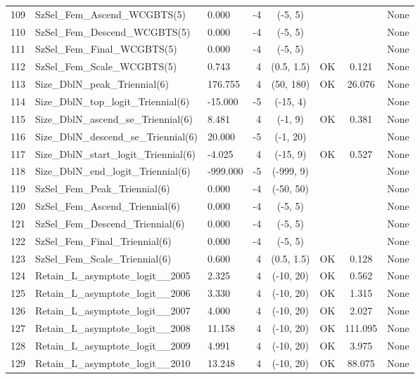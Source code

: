 \documentclass[12pt,]{article}
\begin{document}
\begin{landscape}
\begin{longtable}{lp{2.5in}lrcccl}
  109 & SzSel\_Fem\_Ascend\_WCGBTS(5) & 0.000 & -4 & (-5, 5) &  &  & None \\ 
  110 & SzSel\_Fem\_Descend\_WCGBTS(5) & 0.000 & -4 & (-5, 5) &  &  & None \\ 
  111 & SzSel\_Fem\_Final\_WCGBTS(5) & 0.000 & -4 & (-5, 5) &  &  & None \\ 
  112 & SzSel\_Fem\_Scale\_WCGBTS(5) & 0.743 & 4 & (0.5, 1.5) & OK & 0.121 & None \\ 
  113 & Size\_DblN\_peak\_Triennial(6) & 176.755 & 4 & (50, 180) & OK & 26.076 & None \\ 
  114 & Size\_DblN\_top\_logit\_Triennial(6) & -15.000 & -5 & (-15, 4) &  &  & None \\ 
  115 & Size\_DblN\_ascend\_se\_Triennial(6) & 8.481 & 4 & (-1, 9) & OK & 0.381 & None \\ 
  116 & Size\_DblN\_descend\_se\_Triennial(6) & 20.000 & -5 & (-1, 20) &  &  & None \\ 
  117 & Size\_DblN\_start\_logit\_Triennial(6) & -4.025 & 4 & (-15, 9) & OK & 0.527 & None \\ 
  118 & Size\_DblN\_end\_logit\_Triennial(6) & -999.000 & -5 & (-999, 9) &  &  & None \\ 
  119 & SzSel\_Fem\_Peak\_Triennial(6) & 0.000 & -4 & (-50, 50) &  &  & None \\ 
  120 & SzSel\_Fem\_Ascend\_Triennial(6) & 0.000 & -4 & (-5, 5) &  &  & None \\ 
  121 & SzSel\_Fem\_Descend\_Triennial(6) & 0.000 & -4 & (-5, 5) &  &  & None \\ 
  122 & SzSel\_Fem\_Final\_Triennial(6) & 0.000 & -4 & (-5, 5) &  &  & None \\ 
  123 & SzSel\_Fem\_Scale\_Triennial(6) & 0.600 & 4 & (0.5, 1.5) & OK & 0.128 & None \\ 
  124 & Retain\_L\_asymptote\_logit\_\_2005 & 2.325 & 4 & (-10, 20) & OK & 0.562 & None \\ 
  125 & Retain\_L\_asymptote\_logit\_\_2006 & 3.330 & 4 & (-10, 20) & OK & 1.315 & None \\ 
  126 & Retain\_L\_asymptote\_logit\_\_2007 & 4.000 & 4 & (-10, 20) & OK & 2.027 & None \\ 
  127 & Retain\_L\_asymptote\_logit\_\_2008 & 11.158 & 4 & (-10, 20) & OK & 111.095 & None \\ 
  128 & Retain\_L\_asymptote\_logit\_\_2009 & 4.991 & 4 & (-10, 20) & OK & 3.975 & None \\ 
  129 & Retain\_L\_asymptote\_logit\_\_2010 & 13.248 & 4 & (-10, 20) & OK & 88.075 & None \\ 

\end{longtable}
\end{landscape}
\end{document}
